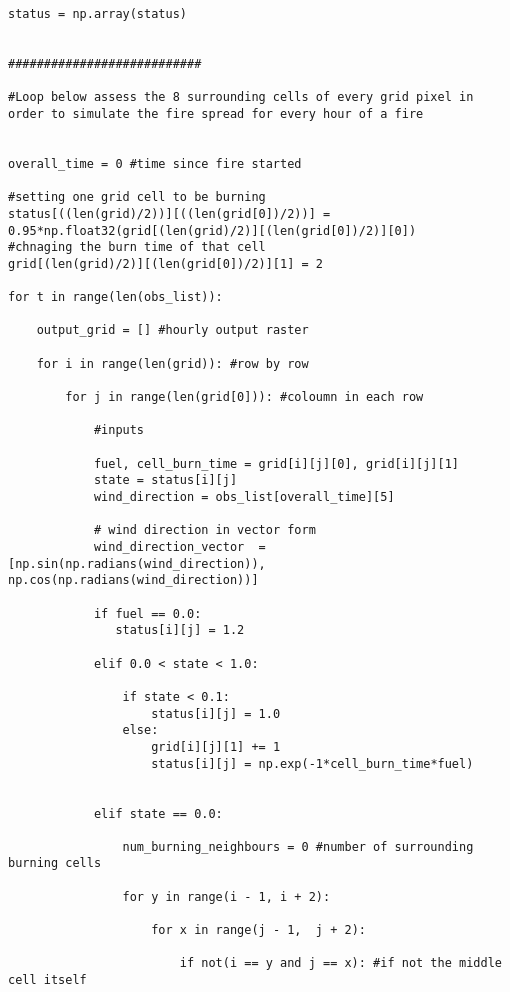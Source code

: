 \begin{lstlisting}
status = np.array(status)


###########################

#Loop below assess the 8 surrounding cells of every grid pixel in order to simulate the fire spread for every hour of a fire
    

overall_time = 0 #time since fire started

#setting one grid cell to be burning
status[((len(grid)/2))][((len(grid[0])/2))] = 0.95*np.float32(grid[(len(grid)/2)][(len(grid[0])/2)][0])
#chnaging the burn time of that cell 
grid[(len(grid)/2)][(len(grid[0])/2)][1] = 2  

for t in range(len(obs_list)):

    output_grid = [] #hourly output raster 

    for i in range(len(grid)): #row by row

        for j in range(len(grid[0])): #coloumn in each row
                                                                                                                                             
            #inputs

            fuel, cell_burn_time = grid[i][j][0], grid[i][j][1]
            state = status[i][j]
            wind_direction = obs_list[overall_time][5]
            
            # wind direction in vector form
            wind_direction_vector  = [np.sin(np.radians(wind_direction)), np.cos(np.radians(wind_direction))]
            
            if fuel == 0.0:
               status[i][j] = 1.2
               
            elif 0.0 < state < 1.0:
                
                if state < 0.1:
                    status[i][j] = 1.0
                else:
                    grid[i][j][1] += 1
                    status[i][j] = np.exp(-1*cell_burn_time*fuel)
                    
                    
            elif state == 0.0:

                num_burning_neighbours = 0 #number of surrounding burning cells
                
                for y in range(i - 1, i + 2):
                        
                    for x in range(j - 1,  j + 2):

                        if not(i == y and j == x): #if not the middle cell itself


\end{lstlisting}
